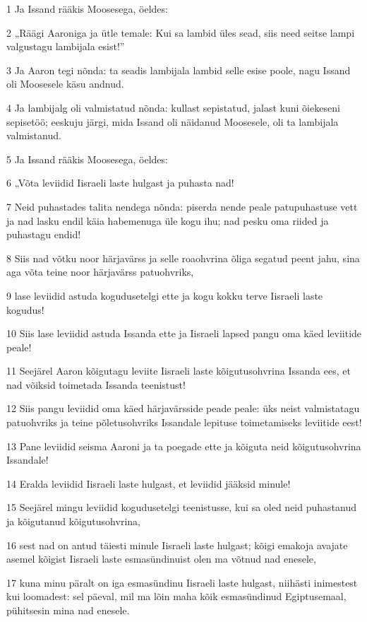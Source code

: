\par 1 Ja Issand rääkis Moosesega, öeldes:
\par 2 „Räägi Aaroniga ja ütle temale: Kui sa lambid üles sead, siis need seitse lampi valgustagu lambijala esist!”
\par 3 Ja Aaron tegi nõnda: ta seadis lambijala lambid selle esise poole, nagu Issand oli Moosesele käsu andnud.
\par 4 Ja lambijalg oli valmistatud nõnda: kullast sepistatud, jalast kuni õiekeseni sepisetöö; eeskuju järgi, mida Issand oli näidanud Moosesele, oli ta lambijala valmistanud.
\par 5 Ja Issand rääkis Moosesega, öeldes:
\par 6 „Võta leviidid Iisraeli laste hulgast ja puhasta nad!
\par 7 Neid puhastades talita nendega nõnda: piserda nende peale patupuhastuse vett ja nad lasku endil käia habemenuga üle kogu ihu; nad pesku oma riided ja puhastagu endid!
\par 8 Siis nad võtku noor härjavärss ja selle roaohvrina õliga segatud peent jahu, sina aga võta teine noor härjavärss patuohvriks,
\par 9 lase leviidid astuda kogudusetelgi ette ja kogu kokku terve Iisraeli laste kogudus!
\par 10 Siis lase leviidid astuda Issanda ette ja Iisraeli lapsed pangu oma käed leviitide peale!
\par 11 Seejärel Aaron kõigutagu leviite Iisraeli laste kõigutusohvrina Issanda ees, et nad võiksid toimetada Issanda teenistust!
\par 12 Siis pangu leviidid oma käed härjavärsside peade peale: üks neist valmistatagu patuohvriks ja teine põletusohvriks Issandale lepituse toimetamiseks leviitide eest!
\par 13 Pane leviidid seisma Aaroni ja ta poegade ette ja kõiguta neid kõigutusohvrina Issandale!
\par 14 Eralda leviidid Iisraeli laste hulgast, et leviidid jääksid minule!
\par 15 Seejärel mingu leviidid kogudusetelgi teenistusse, kui sa oled neid puhastanud ja kõigutanud kõigutusohvrina,
\par 16 sest nad on antud täiesti minule Iisraeli laste hulgast; kõigi emakoja avajate asemel kõigist Iisraeli laste esmasündinuist olen ma võtnud nad enesele,
\par 17 kuna minu päralt on iga esmasündinu Iisraeli laste hulgast, niihästi inimestest kui loomadest: sel päeval, mil ma lõin maha kõik esmasündinud Egiptusemaal, pühitsesin mina nad enesele.
